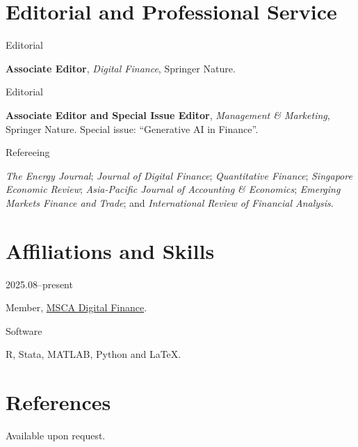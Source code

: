 \documentclass[11pt]{article}
\newcommand{\cvrow}[2]{%
  \par\noindent\needspace{2\baselineskip}%
  \begin{minipage}[t]{0.17\linewidth}\raggedright\sff\footnotesize\color{plum}#1\end{minipage}%
  \hfill\begin{minipage}[t]{0.81\linewidth}#2\end{minipage}%
  \par\addvspace{5.5pt}}
\begin{document}
\section{Editorial and Professional Service}
\cvrow{Editorial}{\textbf{Associate Editor}, \textit{Digital Finance}, Springer Nature.}
\cvrow{Editorial}{\textbf{Associate Editor and Special Issue Editor},
\textit{Management \& Marketing}, Springer Nature. Special issue: ``Generative AI in Finance''.}
\cvrow{Refereeing}{\textit{The Energy Journal}; \textit{Journal of Digital Finance};
\textit{Quantitative Finance}; \textit{Singapore Economic Review};
\textit{Asia-Pacific Journal of Accounting \& Economics};
\textit{Emerging Markets Finance and Trade}; and
\textit{International Review of Financial Analysis}.}

\section{Affiliations and Skills}
\cvrow{2025.08--present}{Member, \href{https://www.digital-finance-msca.com/people/ruting-wang}{MSCA Digital Finance}.}
\cvrow{Software}{R, Stata, MATLAB, Python and \LaTeX.}

\section{References}
{\color{inksoft}Available upon request.}
\end{document}
